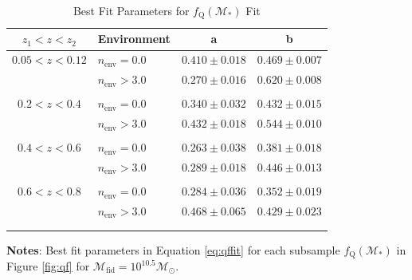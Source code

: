\documentclass{emulateapj}
\def \lowenvthresh {0.0}
\def \highenvthresh {3.0}
\begin{document}
\begin{table} 
  \caption{Best Fit Parameters for $f_{\mathrm{Q}}(\mathcal{M}_{*})$ Fit}
  \label{tab:bestfitparam}
  \begin{center}
    \leavevmode
    \begin{tabular}{clcc} \hline \hline              
    $z_1 < z < z_2$ &Environment        &a  &b  \\ \hline 
$0.05 < z< 0.12$ &$n_{\mathrm{env}} = \lowenvthresh$ & $0.410 \pm 0.018$ & $0.469 \pm 0.007$ \\
               &$n_{\mathrm{env}} > \highenvthresh$ & $0.270 \pm 0.016$ & $0.620 \pm 0.008$ \\ 
                              &               &                       &                           \\ \hline   
$0.2 < z <0.4$ & $n_{\mathrm{env}} = \lowenvthresh$ & $0.340 \pm 0.032$ & $0.432 \pm 0.015$ \\
               &$n_{\mathrm{env}} > \highenvthresh$ & $0.432 \pm 0.018$ & $0.544 \pm 0.010$ \\
               &               &                       &                           \\ \hline
$0.4 < z < 0.6$      &$n_{\mathrm{env}} = \lowenvthresh$ & $0.263 \pm 0.038$ & $0.381 \pm 0.018$ \\
               &$n_{\mathrm{env}} > \highenvthresh$ & $0.289 \pm 0.018$ & $0.446 \pm 0.013$ \\
               &               &                       &                           \\ \hline
$0.6 < z < 0.8$      &$n_{\mathrm{env}} = \lowenvthresh$ & $0.284 \pm 0.036$ & $0.352 \pm 0.019$ \\
               &$n_{\mathrm{env}} > \highenvthresh$            & $0.468 \pm 0.065$ & $0.429 \pm 0.023$ \\
               &               &                       &                           \\ \hline
  \multicolumn{4}{l}{}                                             \\       
    \end{tabular} \par
    \end{center}
    {\bf Notes}: Best fit parameters in Equation \ref{eq:qffit} for each subsample $f_{\mathrm{Q}}(\mathcal{M}_{*})$ in Figure \ref{fig:qf} for $\mathcal{M}_{\mathrm{fid}} = 10^{10.5} \mathcal{M}_{\odot}$.
\end{table}
\end{document}
